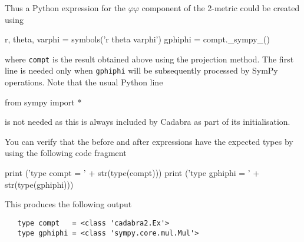 \documentclass[a4paper,12pt]{article}
\numberwithin{equation}{section}%
\begin{document}
Thus a Python expression for the $\varphi\varphi$ component of the 2-metric could be created
using
\begin{cadabra}[numbers=none]
   r, theta, varphi = symbols('r theta varphi')
   gphiphi = compt._sympy_()
\end{cadabra}
where \verb|compt| is the result obtained above using the projection method. The first line
is needed only when \verb|gphiphi| will be subsequently processed by SymPy operations. Note
that the usual Python line
\goodbreak
\begin{cadabra}[numbers=none]
   from sympy import *
\end{cadabra}
is not needed as this is always included by Cadabra as part of its initialisation.

You can verify that the before and after expressions have the expected types by using the
following code fragment
\begin{cadabra}[numbers=none]
   print ('type compt   = ' + str(type(compt)))
   print ('type gphiphi = ' + str(type(gphiphi)))
\end{cadabra}
This produces the following output
\bgroup
\lstset{numbers=none}
\begin{lstlisting}
   type compt   = <class 'cadabra2.Ex'>
   type gphiphi = <class 'sympy.core.mul.Mul'>
\end{lstlisting}
\egroup

\end{document}
